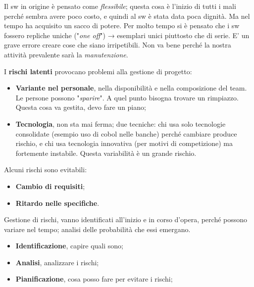 Il sw in origine è pensato come \textit{flessibile}; questa cosa è l'inizio di tutti i mali perché sembra avere poco costo, e quindi al sw è stata data poca dignità. Ma nel tempo ha acquisito un sacco di potere. Per molto tempo si è pensato che i sw fossero repliche uniche ("\textit{one off}") → esemplari unici piuttosto che di serie. E' un grave errore creare cose che siano irripetibili. Non va bene perché la nostra attività prevalente sarà la \textit{manutenzione}.

I \textbf{rischi latenti} provocano problemi alla gestione di progetto:

\begin{itemize}

	\item \textbf{Variante nel personale}, nella disponibilità e nella composizione del team. Le persone possono "\textit{sparire}". A quel punto bisogna trovare un rimpiazzo. Questa cosa va gestita, devo fare un piano;
	
	\item \textbf{Tecnologia}, non sta mai ferma; due tecniche: chi usa solo tecnologie consolidate (esempio uso di cobol nelle banche) perché cambiare produce rischio, e chi usa tecnologia innovativa (per motivi di competizione) ma fortemente instabile. Questa variabilità è un grande rischio.

\end{itemize}

Alcuni rischi sono evitabili:

\begin{itemize}

	\item \textbf{Cambio di requisiti};
	
	\item \textbf{Ritardo nelle specifiche}.

\end{itemize}

Gestione di rischi, vanno identificati all'inizio e in corso d'opera, perché possono variare nel tempo; analisi delle probabilità che essi emergano.

\begin{itemize}

	\item \textbf{Identificazione}, capire quali sono;
	
	\item \textbf{Analisi}, analizzare i rischi;
	
	\item \textbf{Pianificazione}, cosa posso fare per evitare i rischi;

\end{itemize}

